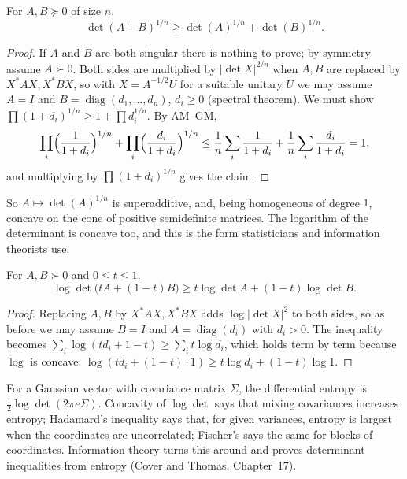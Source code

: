 \begin{theorem}\label{linear:thm:minkowskidet}
For $A,B\succeq0$ of size $n$,
\[
\det(A+B)^{1/n}\ge\det(A)^{1/n}+\det(B)^{1/n}.
\]
\end{theorem}
\begin{proof}
If $A$ and $B$ are both singular there is nothing to prove; by symmetry assume $A\succ0$. Both sides are multiplied by $|\det X|^{2/n}$
when $A,B$ are replaced by $X^*AX,X^*BX$, so with $X=A^{-1/2}U$ for a suitable unitary $U$ we may assume $A=I$ and $B=\operatorname{diag}
(d_1,\dots,d_n)$, $d_i\ge0$ (spectral theorem). We must show $\prod(1+d_i)^{1/n}\ge1+\prod d_i^{1/n}$. By AM--GM,
\[
\prod_i\Bigl(\frac1{1+d_i}\Bigr)^{1/n}+\prod_i\Bigl(\frac{d_i}{1+d_i}\Bigr)^{1/n}\le\frac1n\sum_i\frac1{1+d_i}+\frac1n\sum_i\frac{d_i}{1+d_i}=1,
\]
and multiplying by $\prod(1+d_i)^{1/n}$ gives the claim.
\end{proof}

So $A\mapsto\det(A)^{1/n}$ is superadditive, and, being homogeneous of degree $1$, concave on the cone of positive semidefinite matrices.
The logarithm of the determinant is concave too, and this is the form statisticians and information theorists use.

\begin{theorem}\label{linear:thm:logdet}
For $A,B\succ0$ and $0\le t\le1$,
\[
\log\det\bigl(tA+(1-t)B\bigr)\ge t\log\det A+(1-t)\log\det B.
\]
\end{theorem}
\begin{proof}
Replacing $A,B$ by $X^*AX,X^*BX$ adds $\log|\det X|^2$ to both sides, so as before we may assume $B=I$ and $A=\operatorname{diag}(d_i)$
with $d_i>0$. The inequality becomes $\sum_i\log(td_i+1-t)\ge\sum_it\log d_i$, which holds term by term because $\log$ is concave:
$\log(td_i+(1-t)\cdot1)\ge t\log d_i+(1-t)\log1$.
\end{proof}

\begin{remark}
For a Gaussian vector with covariance matrix $\Sigma$, the differential entropy is $\frac12\log\det(2\pi e\Sigma)$. Concavity of
$\log\det$ says that mixing covariances increases entropy; Hadamard's inequality says that, for given variances, entropy is largest
when the coordinates are uncorrelated; Fischer's says the same for blocks of coordinates. Information theory turns this around
and proves determinant inequalities from entropy (Cover and Thomas, Chapter~17).
\end{remark}


